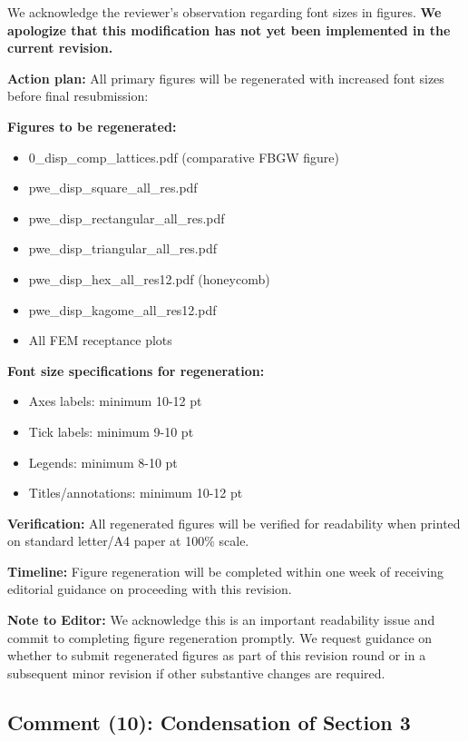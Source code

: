 \documentclass[11pt,a4paper]{article}
\newenvironment{responsebox}{%
    \par\medskip\noindent{\color{responsecolor}\rule{\linewidth}{2pt}}\par
    \noindent{\color{responsecolor}\bfseries Response}\par\smallskip
}{%
    \par\noindent{\color{responsecolor}\rule{\linewidth}{0.5pt}}\medskip
}
\begin{document}
\begin{responsebox}
We acknowledge the reviewer's observation regarding font sizes in figures. \textbf{We apologize that this modification has not yet been implemented in the current revision.}

\textbf{Action plan:} All primary figures will be regenerated with increased font sizes before final resubmission:

\textbf{Figures to be regenerated:}
\begin{itemize}
    \item 0\_disp\_comp\_lattices.pdf (comparative FBGW figure)
    \item pwe\_disp\_square\_all\_res.pdf
    \item pwe\_disp\_rectangular\_all\_res.pdf
    \item pwe\_disp\_triangular\_all\_res.pdf
    \item pwe\_disp\_hex\_all\_res12.pdf (honeycomb)
    \item pwe\_disp\_kagome\_all\_res12.pdf
    \item All FEM receptance plots
\end{itemize}

\textbf{Font size specifications for regeneration:}
\begin{itemize}
    \item Axes labels: minimum 10-12 pt
    \item Tick labels: minimum 9-10 pt
    \item Legends: minimum 8-10 pt
    \item Titles/annotations: minimum 10-12 pt
\end{itemize}

\textbf{Verification:} All regenerated figures will be verified for readability when printed on standard letter/A4 paper at 100\% scale.

\textbf{Timeline:} Figure regeneration will be completed within one week of receiving editorial guidance on proceeding with this revision.
\end{responsebox}

\textbf{Note to Editor:} We acknowledge this is an important readability issue and commit to completing figure regeneration promptly. We request guidance on whether to submit regenerated figures as part of this revision round or in a subsequent minor revision if other substantive changes are required.

\newpage

\subsection*{Comment (10): Condensation of Section 3}
\end{document}
